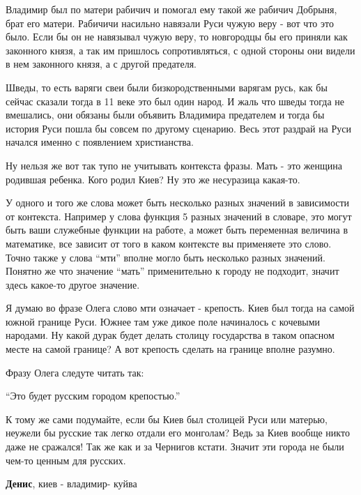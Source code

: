 \begin{itemize}
\begin{itemize}
Владимир был по матери рабичич и помогал ему такой же рабичич Добрыня, брат его
матери. Рабичичи насильно навязали Руси чужую веру - вот что это было. Если бы
он не навязывал чужую веру, то новгородцы бы его приняли как законного князя, а
так им пришлось сопротивляться, с одной стороны они видели в нем законного
князя, а с другой предателя.

Шведы, то есть варяги свеи были бизкородственными варягам русь, как бы сейчас
сказали тогда в 11 веке это был один народ. И жаль что шведы тогда не
вмешались, они обязаны были объявить Владимира предателем и тогда бы история
Руси пошла бы совсем по другому сценарию. Весь этот раздрай на Руси начался
именно с появлением христианства.

\end{itemize} %


Ну нельзя же вот так тупо не учитывать контекста фразы. Мать - это женщина
родившая ребенка. Кого родил Киев? Ну это же несуразица какая-то.

У одного и того же слова может быть несколько разных значений в зависимости от
контекста. Например у слова функция 5 разных значений в словаре, это могут быть
ваши служебные функции на работе, а может быть переменная величина в
математике, все зависит от того в каком контексте вы применяете это слово.
Точно также у слова \enquote{мти} вполне могло быть несколько разных значений. Понятно
же что значение \enquote{мать} применительно к городу не подходит, значит здесь
какое-то другое значение.

Я думаю во фразе Олега слово мти означает - крепость. Киев был тогда на самой
южной границе Руси. Южнее там уже дикое поле начиналось с кочевыми народами. Ну
какой дурак будет делать столицу государства в таком опасном месте на самой
границе? А вот крепость сделать на границе вполне разумно.

Фразу Олега следуте читать так:

\enquote{Это будет русским городом крепостью.}

К тому же сами подумайте, если бы Киев был столицей Руси или матерью, неужели
бы русские так легко отдали его монголам? Ведь за Киев вообще никто даже не
сражался! Так же как и за Чернигов кстати. Значит эти города не были чем-то
ценным для русских.

\begin{itemize} %
\textbf{Денис}, киев - владимир- куйва
\end{itemize} %


\end{itemize}
